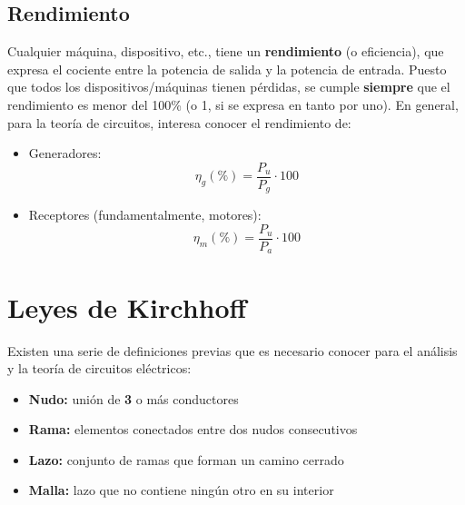 \documentclass[11pt]{book} %
\begin{document}
	\subsection{Rendimiento}
	Cualquier máquina, dispositivo, etc., tiene un \textbf{rendimiento} (o eficiencia), que expresa el cociente entre la potencia de salida y la potencia de entrada. Puesto que todos los dispositivos/máquinas tienen pérdidas, se cumple \textbf{siempre} que el rendimiento es menor del 100\% (o 1, si se expresa en tanto por uno). En general, para la teoría de circuitos, interesa conocer el rendimiento de:
	\begin{itemize}
		\item Generadores:
		\begin{equation}
			\boxed{\eta_g (\%) = \frac{P_{u}}{P_{g}}\cdot 100}
		\end{equation}
		\item Receptores (fundamentalmente, motores):
		\begin{equation}
			\boxed{\eta_m (\%) = \frac{P_{u}}{P_{a}}\cdot 100}
		\end{equation}
	\end{itemize}
	
	
	
	

	
	\section{Leyes de Kirchhoff}
	
	Existen una serie de definiciones previas que es necesario conocer para el análisis y la teoría de circuitos eléctricos:
	\begin{itemize}
		\item \textbf{Nudo:} unión de \textbf{3} o más conductores
		\item \textbf{Rama:} elementos conectados entre dos nudos consecutivos
		\item \textbf{Lazo:} conjunto de ramas que forman un camino cerrado
		\item \textbf{Malla:} lazo que no contiene ningún otro en su interior
	\end{itemize}
	
\end{document}
